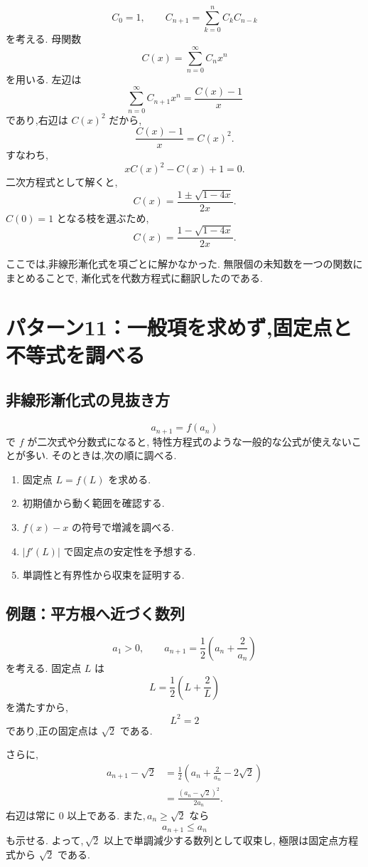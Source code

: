 \[
  C_0=1,\qquad
  C_{n+1}=\sum_{k=0}^{n}C_kC_{n-k}
\]
を考える.
母関数
\[
  C(x)=\sum_{n=0}^{\infty}C_nx^n
\]
を用いる.
左辺は
\[
  \sum_{n=0}^{\infty}C_{n+1}x^{n}
  =\frac{C(x)-1}{x}
\]
であり,右辺は $C(x)^2$ だから,
\[
  \frac{C(x)-1}{x}=C(x)^2.
\]
すなわち,
\[
  xC(x)^2-C(x)+1=0.
\]
二次方程式として解くと,
\[
  C(x)=\frac{1\pm\sqrt{1-4x}}{2x}.
\]
$C(0)=1$ となる枝を選ぶため,
\[
  C(x)=\frac{1-\sqrt{1-4x}}{2x}.
\]

ここでは,非線形漸化式を項ごとに解かなかった.
無限個の未知数を一つの関数にまとめることで,
漸化式を代数方程式に翻訳したのである.

\section{パターン11：一般項を求めず,固定点と不等式を調べる}

\subsection{非線形漸化式の見抜き方}

\[
  a_{n+1}=f(a_n)
\]
で $f$ が二次式や分数式になると,
特性方程式のような一般的な公式が使えないことが多い.
そのときは,次の順に調べる.

\begin{enumerate}
  \item 固定点 $L=f(L)$ を求める.
  \item 初期値から動く範囲を確認する.
  \item $f(x)-x$ の符号で増減を調べる.
  \item $|f'(L)|$ で固定点の安定性を予想する.
  \item 単調性と有界性から収束を証明する.
\end{enumerate}

\subsection{例題：平方根へ近づく数列}

\[
  a_1>0,\qquad
  a_{n+1}=\frac12\left(a_n+\frac{2}{a_n}\right)
\]
を考える.
固定点 $L$ は
\[
  L=\frac12\left(L+\frac2L\right)
\]
を満たすから,
\[
  L^2=2
\]
であり,正の固定点は $\sqrt2$ である.

さらに,
\[
\begin{aligned}
  a_{n+1}-\sqrt2
  &=\frac12\left(a_n+\frac2{a_n}-2\sqrt2\right)\\
  &=\frac{(a_n-\sqrt2)^2}{2a_n}.
\end{aligned}
\]
右辺は常に $0$ 以上である.
また,\,$a_n\ge\sqrt2$ なら
\[
  a_{n+1}\le a_n
\]
も示せる.
よって,\,$\sqrt2$ 以上で単調減少する数列として収束し,
極限は固定点方程式から $\sqrt2$ である.

